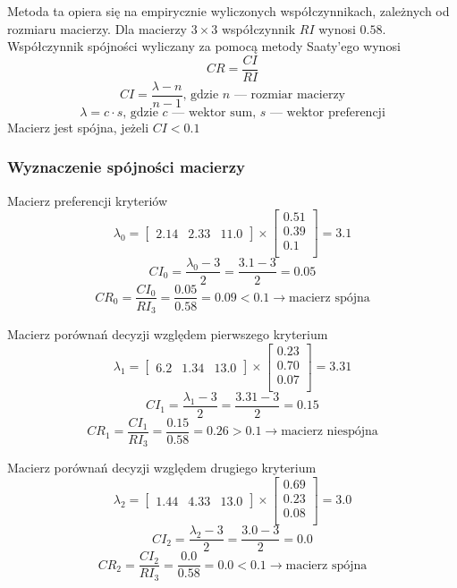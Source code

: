 \documentclass[a4paper,notitlepage]{article}
\begin{document}
Metoda ta opiera się na empirycznie wyliczonych współczynnikach, zależnych od rozmiaru macierzy. Dla macierzy $3 \times 3$ współczynnik $RI$ wynosi $0.58$.
Współczynnik spójności wyliczany za pomocą metody Saaty'ego wynosi
\[ CR = \frac{CI}{RI} \]
\[ CI = \frac{\lambda - n}{n - 1} \textrm{, gdzie $n$ --- rozmiar macierzy} \]
\[ \lambda = c \cdot s \textrm{, gdzie $c$ --- wektor sum, $s$ --- wektor preferencji} \]
Macierz jest spójna, jeżeli $CI < 0.1$

\subsubsection{Wyznaczenie spójności macierzy}
Macierz preferencji kryteriów
\[ \lambda_0 = \left[ \begin{array}{ccc} 2.14 & 2.33 & 11.0 \end{array} \right] \times \left[ \begin{array}{c} 0.51\\ 0.39\\ 0.1\\ \end{array} \right] = 3.1\]
\[ CI_0 = \frac{\lambda_0 - 3}{2} = \frac{3.1 - 3}{2} = 0.05 \]
\[ CR_0 = \frac{CI_0}{RI_3} = \frac{0.05}{0.58} = 0.09 < 0.1 \rightarrow \textrm{macierz spójna} \]

Macierz porównań decyzji względem pierwszego kryterium
\[ \lambda_1 = \left[ \begin{array}{ccc} 6.2 & 1.34 & 13.0 \end{array} \right] \times \left[ \begin{array}{c} 0.23\\ 0.70\\ 0.07\\ \end{array} \right] = 3.31 \]
\[ CI_1 = \frac{\lambda_1 - 3}{2} = \frac{3.31 - 3}{2} = 0.15 \]
\[ CR_1 = \frac{CI_1}{RI_3} = \frac{0.15}{0.58} = 0.26 > 0.1 \rightarrow \textrm{macierz niespójna} \]

Macierz porównań decyzji względem drugiego kryterium
\[ \lambda_2 = \left[ \begin{array}{ccc} 1.44 & 4.33 & 13.0 \end{array} \right] \times \left[ \begin{array}{c} 0.69\\ 0.23\\ 0.08\\ \end{array} \right] = 3.0 \]
\[ CI_2 = \frac{\lambda_2 - 3}{2} = \frac{3.0 - 3}{2}=0.0 \]
\[ CR_2 = \frac{CI_2}{RI_3} = \frac{0.0}{0.58} = 0.0 < 0.1 \rightarrow \textrm{macierz spójna} \]
\end{document}
